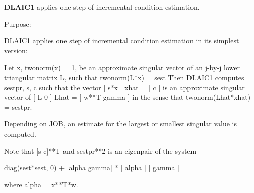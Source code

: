 {\bfseries D\+L\+A\+I\+C1} applies one step of incremental condition estimation. 

 \begin{DoxyParagraph}{Purpose\+: }
\begin{DoxyVerb} DLAIC1 applies one step of incremental condition estimation in
 its simplest version:

 Let x, twonorm(x) = 1, be an approximate singular vector of an j-by-j
 lower triangular matrix L, such that
          twonorm(L*x) = sest
 Then DLAIC1 computes sestpr, s, c such that
 the vector
                 [ s*x ]
          xhat = [  c  ]
 is an approximate singular vector of
                 [ L       0  ]
          Lhat = [ w**T gamma ]
 in the sense that
          twonorm(Lhat*xhat) = sestpr.

 Depending on JOB, an estimate for the largest or smallest singular
 value is computed.

 Note that [s c]**T and sestpr**2 is an eigenpair of the system

     diag(sest*sest, 0) + [alpha  gamma] * [ alpha ]
                                           [ gamma ]

 where  alpha =  x**T*w.\end{DoxyVerb}
 
\end{DoxyParagraph}

